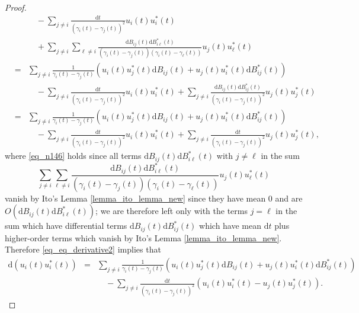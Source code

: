 \documentclass[11pt,letterpaper]{article}
\begin{document}
\begin{proof}
\begin{eqnarray}
  & & \quad - \sum_{j\neq i} \frac{\mathrm{d}t}{(\gamma_i(t)- \gamma_j(t))^2} u_i(t) u_i^\ast(t)\nonumber\\
  & & \quad + \sum_{j \neq i}  \sum_{\ell \neq i} \frac{\mathrm{d}B_{ij}(t)\mathrm{d}B_{i\ell}^\ast(t)}{(\gamma_i(t) - \gamma_j(t)) (\gamma_i(t) - \gamma_\ell(t))} u_j(t)u_{\ell}^\ast(t)\nonumber\\
    &=&  \sum_{j \neq i} \frac{1}{\gamma_i(t) - \gamma_j(t)}(u_i(t) u_j^\ast(t)\mathrm{d}B_{ij}(t) + u_j(t) u_i^\ast(t)\mathrm{d}B_{ij}^\ast(t))\nonumber\\
  & & \quad - \sum_{j\neq i} \frac{\mathrm{d}t}{(\gamma_i(t)- \gamma_j(t))^2} u_i(t) u_i^\ast(t) + \sum_{j \neq i} \frac{\mathrm{d}B_{ij}(t) \mathrm{d}B_{ij}^\ast(t)}{(\gamma_i(t) - \gamma_j(t))^2} u_j(t)u_j^\ast(t) \label{eq_n146}\\
      &=&  \sum_{j \neq i} \frac{1}{\gamma_i(t) - \gamma_j(t)}(u_i(t) u_j^\ast(t)\mathrm{d}B_{ij}(t) + u_j(t) u_i^\ast(t)\mathrm{d}B_{ij}^\ast(t))\nonumber\\
  & & \quad - \sum_{j\neq i} \frac{\mathrm{d}t}{(\gamma_i(t)- \gamma_j(t))^2} u_i(t) u_i^\ast(t) + \sum_{j \neq i} \frac{\mathrm{d}t}{(\gamma_i(t) - \gamma_j(t))^2} u_j(t)u_j^\ast(t), \label{eq_eq_derivative2}
%
\end{eqnarray}
%
%
where \eqref{eq_n146} holds since all terms $\mathrm{d}B_{ij}(t)\mathrm{d}B_{i\ell}^\ast(t)$ with $j \neq \ell$ in the sum $$\sum_{j \neq i}  \sum_{\ell \neq i} \frac{\mathrm{d}B_{ij}(t)\mathrm{d}B_{i\ell}^\ast(t)}{(\gamma_i(t) - \gamma_j(t)) (\gamma_i(t) - \gamma_\ell(t))} u_j(t)u_{\ell}^\ast(t)$$  vanish by Ito's Lemma \ref{lemma_ito_lemma_new} since they have mean 0 and are $O(\mathrm{d}B_{ij}(t) \mathrm{d}B_{i\ell}^\ast(t))$; we are therefore left only with the terms $j = \ell$ in the sum which have differential terms $\mathrm{d}B_{ij}(t)\mathrm{d}B_{ij}^\ast(t)$ which have mean $\mathrm{d}t$ plus higher-order terms which vanish by Ito's Lemma \ref{lemma_ito_lemma_new}. 
%
Therefore  \eqref{eq_eq_derivative2} implies that
%
\begin{eqnarray*}
    \mathrm{d}(u_i(t) u_i^\ast(t)) 
     &=& \sum_{j \neq i} \frac{1}{\gamma_i(t) - \gamma_j(t)}(u_i(t) u_j^\ast(t)\mathrm{d}B_{ij}(t) + u_j(t) u_i^\ast(t)\mathrm{d}B_{ij}^\ast(t))\nonumber \\
    & & \quad - \sum_{j\neq i} \frac{\mathrm{d}t}{(\gamma_i(t)- \gamma_j(t))^2} (u_i(t) u_i^\ast(t) - u_j(t)u_j^\ast(t)).
\end{eqnarray*}
%
\end{proof}
\end{document}
